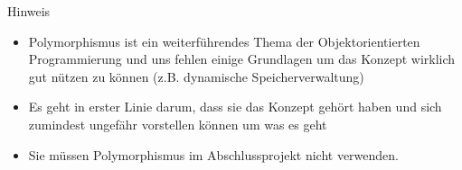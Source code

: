 \documentclass[presentation]{beamer}
\begin{document}
\begin{frame}[label={sec:org22aa3cb}]{Hinweis}
\begin{itemize}
\item \alert{Polymorphismus} ist ein weiterführendes Thema der
Objektorientierten Programmierung und uns fehlen einige Grundlagen
um das Konzept wirklich gut nützen zu können (z.B. dynamische
Speicherverwaltung)
\item Es geht in erster Linie darum, \alert{dass sie das Konzept gehört haben}
und sich zumindest ungefähr vorstellen können um was es geht
\item Sie müssen Polymorphismus im Abschlussprojekt nicht verwenden.
\end{itemize}
\end{frame}
\end{document}
